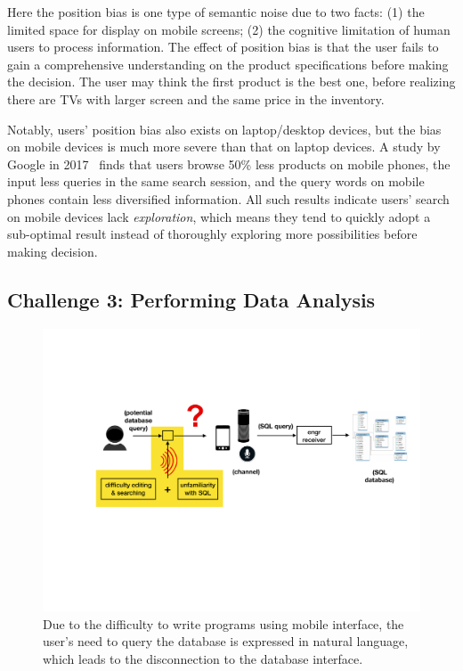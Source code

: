 Here the position bias is one type of semantic noise due to two facts: (1) the limited space for display on mobile screens; (2) the cognitive limitation of human users to process information. The effect of position bias is that the user fails to gain a comprehensive understanding on the product specifications before making the decision. The user may think the first product is the best one, before realizing there are TVs with larger screen and the same price in the inventory. 

Notably, users' position bias also exists on laptop/desktop devices, but the bias on mobile devices is much more severe than that on laptop devices. A study by Google in 2017~\cite{ong2017using} finds that users browse 50\% less products on mobile phones, the input less queries in the same search session, and the query words on mobile phones contain less diversified information. All such results indicate users' search on mobile devices lack \textit{exploration}, which means they tend to quickly adopt a sub-optimal result instead of thoroughly exploring more possibilities before making decision. 

\subsection{Challenge 3: Performing Data Analysis}

\begin{figure}[h]
\centering
\includegraphics[width=.85\linewidth]{figure/chapter1/gui2_challenge}
\caption{Due to the difficulty to write programs using mobile interface, the user's need to query the database is expressed in natural language, which leads to the disconnection to the database interface.\label{fig:ch1:gui2}}
\end{figure} 

